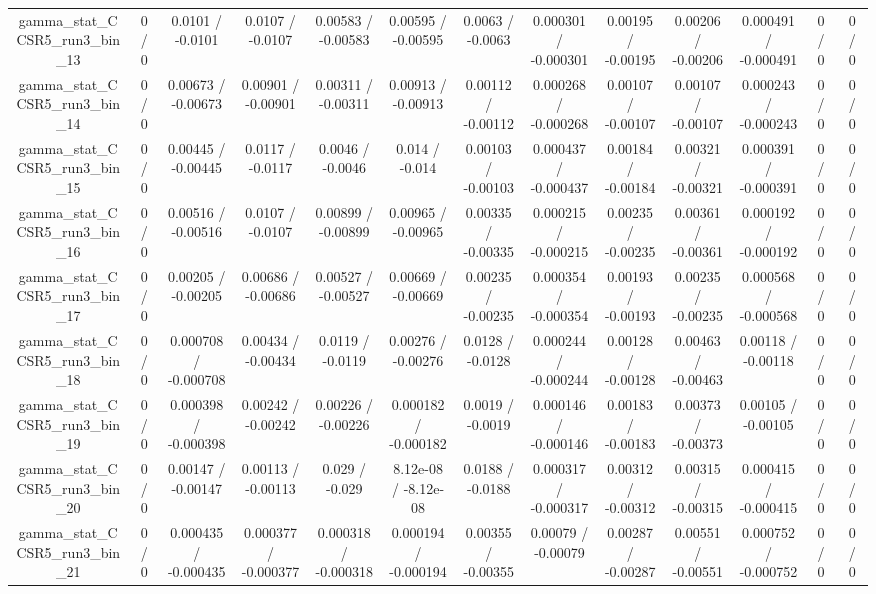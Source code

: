 \documentclass[10pt]{article}
\begin{document}
\begin{table}[htbp]
\begin{center}
\begin{tabular}{|c|c|c|c|c|c|c|c|c|c|c|c|c|}
  gamma_stat_CCSR5_run3_bin_13 & 0 / 0 & 0.0101 / -0.0101 & 0.0107 / -0.0107 & 0.00583 / -0.00583 & 0.00595 / -0.00595 & 0.0063 / -0.0063 & 0.000301 / -0.000301 & 0.00195 / -0.00195 & 0.00206 / -0.00206 & 0.000491 / -0.000491 & 0 / 0 & 0 / 0 \\ 
  gamma_stat_CCSR5_run3_bin_14 & 0 / 0 & 0.00673 / -0.00673 & 0.00901 / -0.00901 & 0.00311 / -0.00311 & 0.00913 / -0.00913 & 0.00112 / -0.00112 & 0.000268 / -0.000268 & 0.00107 / -0.00107 & 0.00107 / -0.00107 & 0.000243 / -0.000243 & 0 / 0 & 0 / 0 \\ 
  gamma_stat_CCSR5_run3_bin_15 & 0 / 0 & 0.00445 / -0.00445 & 0.0117 / -0.0117 & 0.0046 / -0.0046 & 0.014 / -0.014 & 0.00103 / -0.00103 & 0.000437 / -0.000437 & 0.00184 / -0.00184 & 0.00321 / -0.00321 & 0.000391 / -0.000391 & 0 / 0 & 0 / 0 \\ 
  gamma_stat_CCSR5_run3_bin_16 & 0 / 0 & 0.00516 / -0.00516 & 0.0107 / -0.0107 & 0.00899 / -0.00899 & 0.00965 / -0.00965 & 0.00335 / -0.00335 & 0.000215 / -0.000215 & 0.00235 / -0.00235 & 0.00361 / -0.00361 & 0.000192 / -0.000192 & 0 / 0 & 0 / 0 \\ 
  gamma_stat_CCSR5_run3_bin_17 & 0 / 0 & 0.00205 / -0.00205 & 0.00686 / -0.00686 & 0.00527 / -0.00527 & 0.00669 / -0.00669 & 0.00235 / -0.00235 & 0.000354 / -0.000354 & 0.00193 / -0.00193 & 0.00235 / -0.00235 & 0.000568 / -0.000568 & 0 / 0 & 0 / 0 \\ 
  gamma_stat_CCSR5_run3_bin_18 & 0 / 0 & 0.000708 / -0.000708 & 0.00434 / -0.00434 & 0.0119 / -0.0119 & 0.00276 / -0.00276 & 0.0128 / -0.0128 & 0.000244 / -0.000244 & 0.00128 / -0.00128 & 0.00463 / -0.00463 & 0.00118 / -0.00118 & 0 / 0 & 0 / 0 \\ 
  gamma_stat_CCSR5_run3_bin_19 & 0 / 0 & 0.000398 / -0.000398 & 0.00242 / -0.00242 & 0.00226 / -0.00226 & 0.000182 / -0.000182 & 0.0019 / -0.0019 & 0.000146 / -0.000146 & 0.00183 / -0.00183 & 0.00373 / -0.00373 & 0.00105 / -0.00105 & 0 / 0 & 0 / 0 \\ 
  gamma_stat_CCSR5_run3_bin_20 & 0 / 0 & 0.00147 / -0.00147 & 0.00113 / -0.00113 & 0.029 / -0.029 & 8.12e-08 / -8.12e-08 & 0.0188 / -0.0188 & 0.000317 / -0.000317 & 0.00312 / -0.00312 & 0.00315 / -0.00315 & 0.000415 / -0.000415 & 0 / 0 & 0 / 0 \\ 
  gamma_stat_CCSR5_run3_bin_21 & 0 / 0 & 0.000435 / -0.000435 & 0.000377 / -0.000377 & 0.000318 / -0.000318 & 0.000194 / -0.000194 & 0.00355 / -0.00355 & 0.00079 / -0.00079 & 0.00287 / -0.00287 & 0.00551 / -0.00551 & 0.000752 / -0.000752 & 0 / 0 & 0 / 0 \\ 

\end{tabular}
\end{center}
\end{table}
\end{document}
